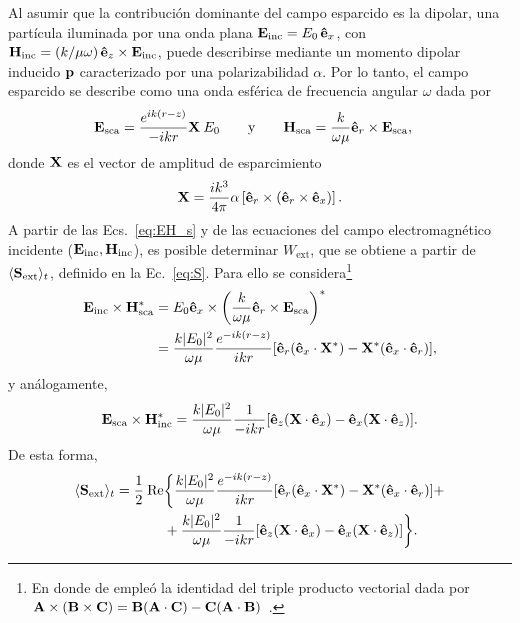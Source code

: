 Al asumir que la contribución dominante del campo esparcido es la dipolar, una partícula iluminada por una onda plana $\vb{E}_{\text{inc}} = E_0\,\vu{e}_x$, con $\vb{H}_{\text{inc}} = (k/\mu\omega)\,\vu{e}_z\times\vb{E}_{\text{inc}}$, puede describirse mediante un momento dipolar inducido $\vb{p}$ caracterizado por una polarizabilidad $\alpha$. Por lo tanto, el campo esparcido se describe como una onda esférica de frecuencia angular $\omega$ dada por \cite{bohrenAbsorptionScatteringLight2008}
%
\begin{align}
	\vb{E}_{\text{sca}}&=\frac{e^{ik(r-z)}}{-ikr}\vb{X}\:E_0 \qquad\text{y}\qquad
	\vb{H}_{\text{sca}}=\frac{k}{\omega\mu}\vu{e}_r\times\vb{E}_{\text{sca}},
	\label{eq:EH_s}
\end{align}
%
donde $\vb{X}$ es el vector de amplitud de esparcimiento
%
\begin{equation}
	\vb{X}=\frac{ik^3}{4\pi}\alpha \left[ \vu{e}_r\times(\vu{e}_r\times \vu{e}_x)\right].
	\label{eq:Xvec}
\end{equation}
%
A partir de las Ecs.~\eqref{eq:EH_s} y de las ecuaciones del campo electromagnético incidente ($\vb{E}_{\text{inc}} , \vb{H}_{\text{inc}} $), es posible determinar $W_{\text{ext}}$, que se obtiene a partir de $\langle\vb{S}_{\text{ext}}\rangle_t$, definido en la Ec.~\eqref{eq:S}. Para ello se considera\footnote{En donde de empleó la identidad del triple producto vectorial dada por $\vb{A}\times(\vb{B}\times\vb{C})=\vb{B}(\vb{A}\cdot\vb{C})-\vb{C}(\vb{A}\cdot\vb{B})$~\cite{griffithsIntroductionElectrodynamics2023}.}
%
\begin{align*}
	\vb{E}_{\text{inc}}\times\vb{H}_{\text{sca}}^*&=E_0\vu{e}_x\times\left(\frac{k}{\omega\mu}\vu{e}_r\times \vb{E}_{\text{sca}}\right)^*\\
	&=\frac{k|E_0|^2}{\omega\mu}\frac{e^{-ik(r-z)}}{ikr}[\vu{e}_r(\vu{e}_x\cdot\vb{X}^*)-\vb{X}^*(\vu{e}_x\cdot\vu{e}_r)],
\end{align*}
%
y análogamente,
%
\begin{equation*}
	\vb{E}_{\text{sca}}\times\vb{H}_{\text{inc}}^*=\frac{k|E_0|^2}{\omega\mu}\frac{1}{-ikr}[\vu{e}_z(\vb{X}\cdot\vu{e}_x)-\vu{e}_x(\vb{X}\cdot\vu{e}_z)].
\end{equation*}
%
De esta forma,
%
\begin{align}
	\langle\vb{S}_{\text{ext}}\rangle_t=\frac{1}{2}\:\mbox{Re}&\biggl\{\frac{k|E_0|^2}{\omega\mu}\frac{e^{-ik(r-z)}}{ikr}[\vu{e}_r(\vu{e}_x\cdot\vb{X}^*)-\vb{X}^*(\vu{e}_x\cdot\vu{e}_r)]+ \nonumber\\ 
	&+\frac{k|E_0|^2}{\omega\mu}\frac{1}{-ikr}[\vu{e}_z(\vb{X}\cdot\vu{e}_x)-\vu{e}_x(\vb{X}\cdot\vu{e}_z)]\biggl\}.\label{eq:S_1}
\end{align}
